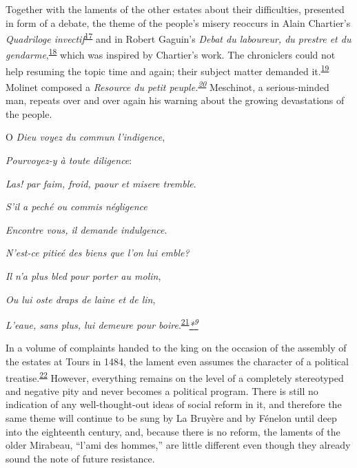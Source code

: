 Together with the laments of the other estates about their difficulties,
presented in form of a debate, the theme of the people's misery reoccurs
in Alain
Char\protect\hypertarget{10_Chapter_Three__THE_HEROIC_DREAM.xhtmlux5cux23page_67}{}{}tier's
\emph{Quadriloge
invectif}\textsuperscript{\protect\hypertarget{10_Chapter_Three__THE_HEROIC_DREAM.xhtmlux5cux23id_1898}{\protect\hyperlink{23_NOTES.xhtmlux5cux23id_1899}{17}}}
and in Robert Gaguin's \emph{Debat du laboureur, du prestre et du
gendarme},\textsuperscript{\protect\hypertarget{10_Chapter_Three__THE_HEROIC_DREAM.xhtmlux5cux23id_1896}{\protect\hyperlink{23_NOTES.xhtmlux5cux23id_1897}{18}}}
which was inspired by Chartier's work. The chroniclers could not help
resuming the topic time and again; their subject matter demanded
it.\textsuperscript{\protect\hypertarget{10_Chapter_Three__THE_HEROIC_DREAM.xhtmlux5cux23id_1894}{\protect\hyperlink{23_NOTES.xhtmlux5cux23id_1895}{19}}}
Molinet composed a \emph{Resource du petit
peuple.\textsuperscript{\protect\hypertarget{10_Chapter_Three__THE_HEROIC_DREAM.xhtmlux5cux23id_1892}{\protect\hyperlink{23_NOTES.xhtmlux5cux23id_1893}{20}}}}
Meschinot, a serious-minded man, repeats over and over again his warning
about the growing devastations of the people.

O \emph{Dieu voyez du commun l'indigence},

\emph{Pourvoyez-y à toute diligence}:

\emph{Las! par faim, froid, paour et misere tremble}.

\emph{S'il a peché ou commis négligence}

\emph{Encontre vous, il demande indulgence}.

\emph{N'est-ce pitieé des biens que l'on lui emble?}

\emph{Il n'a plus bled pour porter au molin},

\emph{Ou lui oste draps de laine et de lin},

\emph{L'eaue, sans plus, lui demeure pour
boire}.\textsuperscript{\protect\hypertarget{10_Chapter_Three__THE_HEROIC_DREAM.xhtmlux5cux23id_1890}{\protect\hyperlink{23_NOTES.xhtmlux5cux23id_1891}{21}}}\emph{\protect\hypertarget{10_Chapter_Three__THE_HEROIC_DREAM.xhtmlux5cux23id_2309}{\protect\hyperlink{23_NOTES.xhtmlux5cux23id_2310}{*\textsuperscript{9}}}}

In a volume of complaints handed to the king on the occasion of the
assembly of the estates at Tours in 1484, the lament even assumes the
character of a political
treatise.\textsuperscript{\protect\hypertarget{10_Chapter_Three__THE_HEROIC_DREAM.xhtmlux5cux23id_1888}{\protect\hyperlink{23_NOTES.xhtmlux5cux23id_1889}{22}}}
However, everything remains on the level of a completely stereotyped and
negative pity and never becomes a political program. There is still no
indication of any well-thought-out ideas of social reform in it, and
therefore the same theme will continue to be sung by La Bruyère and by
Fénelon until deep into the eighteenth century, and, because there is no
reform, the laments of the older Mirabeau, ``l'ami des hommes,'' are
little different even though they already sound the note of future
resistance.


